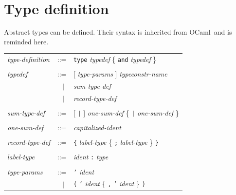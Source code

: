 \documentclass[11pt,titlepage,twoside]{report}
\newcommand{\ocaml}{{\sf OCaml}}
\newcommand{\alt}{\;|\;}
\newcommand{\term}[1]{{\tt #1}}
\newcommand{\nterm}[1]{{\em #1}}
\begin{document}
\section{Type definition}
Abstract types can be defined. Their syntax is inherited from \ocaml\
and is reminded here. 
\begin{center}
\begin{tabular}{lcl}
\nterm{type-definition} 
  & ::=    & \term{type} \nterm{typedef} 
             \{ \term{and} \nterm{typedef} \} 
\\ \\
\nterm{typedef}
  & ::=        & [ \nterm{type-params} ] \nterm{typeconstr-name} \\
  & $\;\;\alt$ & \nterm{sum-type-def} \\
  & $\;\;\alt$ & \nterm{record-type-def} 
\\ \\
\nterm{sum-type-def}
  & ::=        & [ \term{|} ] \nterm{one-sum-def} 
                 \{ \term{|} \nterm{one-sum-def} \} 
\\ \\
\nterm{one-sum-def}     
& ::=        & \nterm{capitalized-ident}
\\ \\
\nterm{record-type-def} 
  & ::=        & \term{\{} \nterm{label-type}
                 \{ \term{;} \nterm{label-type} \} \term{\}} 
\\ \\
\nterm{label-type}
  & ::=        & \nterm{ident} \term{:} \nterm{type} 
\\ \\
\nterm{type-params}
  & ::=        & \term{'} \nterm{ident} \\
  & $\;\;\alt$ & \term{(} \term{'} \nterm{ident} 
                 \{ \term{,} \term{'} \nterm{ident} \} \term{)}
\end{tabular}
\end{center}
\end{document}
